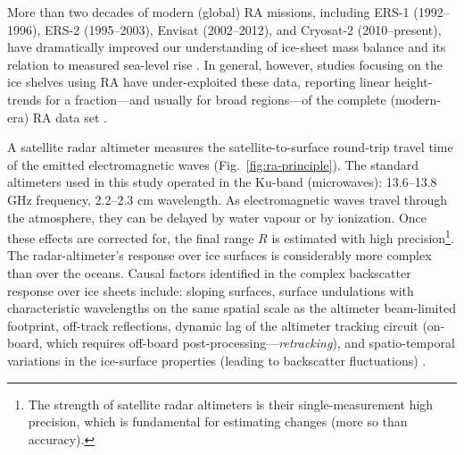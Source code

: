 More than two decades of modern (global) RA missions,
including ERS-1 (1992--1996), ERS-2 (1995--2003), Envisat (2002--2012), and Cryosat-2 (2010--present), have dramatically improved our understanding of ice-sheet
mass balance and its relation to measured sea-level rise \parencite[e.g.,][]{Shepherd2012, Wingham2006}. In general, however,
studies focusing on the ice shelves using RA have under-exploited these data,
reporting linear height-trends for a fraction---and usually for broad regions---of the complete (modern-era) RA data set \parencite[e.g.,][]{Shepherd2003, Shepherd2010, Zwally2005}.

A satellite radar altimeter measures the satellite-to-surface round-trip travel time of the emitted electromagnetic waves (Fig.~\ref{fig:ra-principle}). The standard altimeters used in this study operated in the Ku-band (microwaves): 13.6--13.8 GHz frequency, 2.2--2.3 cm wavelength. As electromagnetic waves travel through the atmosphere, they can be delayed by water vapour or by ionization. Once these effects are corrected for, the final range $R$ is estimated with high precision\footnote{The strength of satellite radar altimeters is their single-measurement high precision, which is fundamental for estimating changes (more so than accuracy).}. The radar-altimeter's response over ice surfaces is considerably more complex than over the oceans. Causal factors identified in the complex backscatter response over ice sheets include: sloping surfaces, surface undulations with characteristic wavelengths on the same spatial scale as the altimeter beam-limited footprint, off-track reflections, dynamic lag of the altimeter tracking circuit (on-board, which requires off-board post-processing---\emph{retracking}), and spatio-temporal variations in the ice-surface properties (leading to backscatter fluctuations) \parencite{Martin1983}. %


